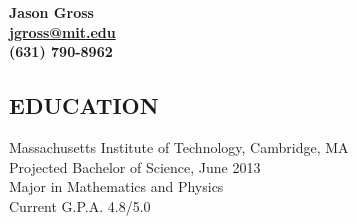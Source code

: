 \documentclass{res}
\begin{document}
 \fontsize{11pt}{12pt}\selectfont

\begin{center}
  \LARGE \bf Jason Gross \\
  \large \href{mailto:jgross@mit.edu}{jgross@mit.edu} \\
  \large (631) 790-8962
\end{center}

\address{\bf  PRESENT ADDRESS\\3 Ames Street, Box \# 99\\Cambridge, MA 02142}
\address{\bf PERMANENT ADDRESS \\ 126 Hayrick Lane \\  Commack, NY 11725}
                                  
\begin{resume}

 
\section{EDUCATION}          
    Massachusetts Institute of Technology, Cambridge, MA  \\        
    Projected Bachelor of Science, June 2013   \\       
    Major in Mathematics and Physics       \\   
    Current G.P.A. 4.8/5.0          

 

\end{resume}
\end{document}
